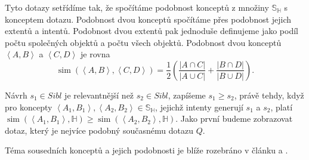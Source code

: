 \documentclass[12pt]{article}
\newcommand{\ssection}[1]{\subsection{#1}}
\newcommand{\sssection}[1]{\subsubsection{#1}}
\newcommand{\addk}[1]{\left(#1\right)}
\newcommand{\addsp}[1]{\left<#1\right>}
\DeclareMathOperator{\tfidf}{tf-idf}
\DeclareMathOperator{\simfca}{sim}
\newcommand{\alldoc}{\mathbb{D}}
\newcommand{\hledany}{\mathbb{H}}
\newcommand{\sibl}{\mathbb{S}}
\begin{document}
Tyto dotazy setřídíme tak, že spočítáme podobnost konceptů z množiny $\sibl_\hledany$ s konceptem dotazu. Podobnost dvou konceptů spočítáme přes podobnost jejich extentů a intentů. Podobnost dvou extentů pak jednoduše definujeme jako podíl počtu společných objektů a počtu všech objektů. Podobnost dvou konceptů $\addsp{A, B}$ a $\addsp{C, D}$ je rovna
$$
\simfca(\addsp{A, B}, \addsp{C, D}) = \frac12\addk{\frac{|A\cap C|}{|A\cup C|} + \frac{|B\cap D|}{|B\cup D|}}.
$$

Návrh $s_1\in Sibl$ je relevantnější než $s_2\in Sibl$, zapíšeme $s_1\ge s_2$, právě tehdy, když pro koncepty $\addsp{A_1, B_1}, \addsp{A_2, B_2} \in \sibl_\hledany$, jejichž intenty generují $s_1$ a $s_2$, platí $\simfca(\addsp{A_1, B_1}, \hledany)\ge\simfca(\addsp{A_2, B_2}, \hledany)$. Jako první budeme zobrazovat dotaz, který je nejvíce podobný současnému dotazu $Q$.

Téma sousedních konceptů a jejich podobnosti je blíže rozebráno v článku \cite{searchsleuth} a \cite{fcasim}.





\end{document}
